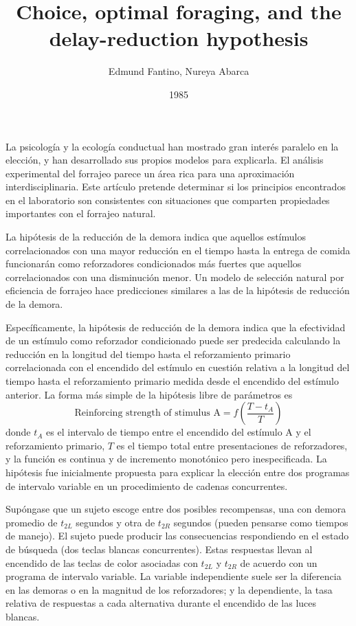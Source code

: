 \documentclass[a4paper,12pt]{article}
\title{Choice, optimal foraging, and the delay-reduction hypothesis}
\author{Edmund Fantino, Nureya Abarca}
\date{1985}
\begin{document}
{\scshape\bfseries \maketitle}

La psicología y la ecología conductual han mostrado gran interés paralelo en la elección, y han desarrollado sus propios modelos para explicarla. El análisis experimental del forrajeo parece un área rica para una aproximación interdisciplinaria. Este artículo pretende determinar si los principios encontrados en el laboratorio son consistentes con situaciones que comparten propiedades importantes con el forrajeo natural.

La hipótesis de la reducción de la demora indica que aquellos estímulos correlacionados con una mayor reducción en el tiempo hasta la entrega de comida funcionarán como reforzadores condicionados más fuertes que aquellos correlacionados con una disminución menor. Un modelo de selección natural por eficiencia de forrajeo hace predicciones similares a las de la hipótesis de reducción de la demora.

Específicamente, la hipótesis de reducción de la demora indica que la efectividad de un estímulo como reforzador condicionado puede ser predecida calculando la reducción en la longitud del tiempo hasta el reforzamiento primario correlacionada con el encendido del estímulo en cuestión relativa a la longitud del tiempo hasta el reforzamiento primario medida desde el encendido del estímulo anterior. La forma más simple de la hipótesis libre de parámetros es
\begin{equation}
\mbox{Reinforcing strength of stimulus A}=f\left(\frac{T-t_A}{T}\right)
\end{equation}
donde $t_A$ es el intervalo de tiempo entre el encendido del estímulo A y el reforzamiento primario, $T$ es el tiempo total entre presentaciones de reforzadores, y la función es continua y de incremento monotónico pero inespecificada. La hipótesis fue inicialmente propuesta para explicar la elección entre dos programas de intervalo variable en un procedimiento de cadenas concurrentes.

Supóngase que un sujeto escoge entre dos posibles recompensas, una con demora promedio de $t_{2L}$ segundos y otra de $t_{2R}$ segundos (pueden pensarse como tiempos de manejo). El sujeto puede producir las consecuencias respondiendo en el estado de búsqueda (dos teclas blancas concurrentes). Estas respuestas llevan al encendido de las teclas de color asociadas con $t_{2L}$ y $t_{2R}$ de acuerdo con un programa de intervalo variable. La variable independiente suele ser la diferencia en las demoras o en la magnitud de los reforzadores; y la dependiente, la tasa relativa de respuestas a cada alternativa durante el encendido de las luces blancas.
\end{document}
